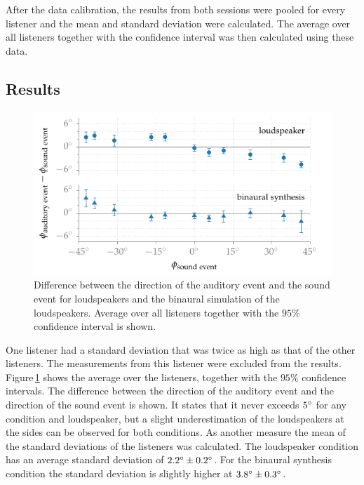 After the data calibration, the results from both sessions were pooled for every
listener and the mean and standard deviation were calculated. The average over all
listeners together with the confidence interval\autocite{Cumming2007} was then
calculated using these data.

\subsection{Results}
\label{sec:results_binaural_localization}
%
\begin{figure}
    \centering
    \includegraphics{fig4_04/fig4_04}
    \caption{Difference between the direction of the auditory event and the
    sound event for loudspeakers and the binaural simulation of the
    loudspeakers. Average over all listeners together with the $95\%$ confidence
    interval is shown.
    }
    \label{fig:binaural_synthesis_localization}
\end{figure}
%
\noindent One listener had a standard deviation that was twice as high as that of
the other listeners. The measurements from this listener
were excluded from the results.
Figure\,\ref{fig:binaural_synthesis_localization} shows the average over the listeners,
together with the $95\%$
confidence intervals.
The difference between the direction of the auditory event and the direction of
the sound event is shown.
It states that it never exceeds $5^\circ$ for any condition and
loudspeaker, but a slight underestimation
of the loudspeakers at the sides can be observed for both conditions.
As another measure the mean of the standard deviations of the listeners was calculated.
The loudspeaker condition has an average standard deviation of 
$2.2^\circ \pm 0.2^\circ$. For the binaural synthesis  condition the standard
deviation is slightly higher at $3.8^\circ \pm 0.3^\circ$.

